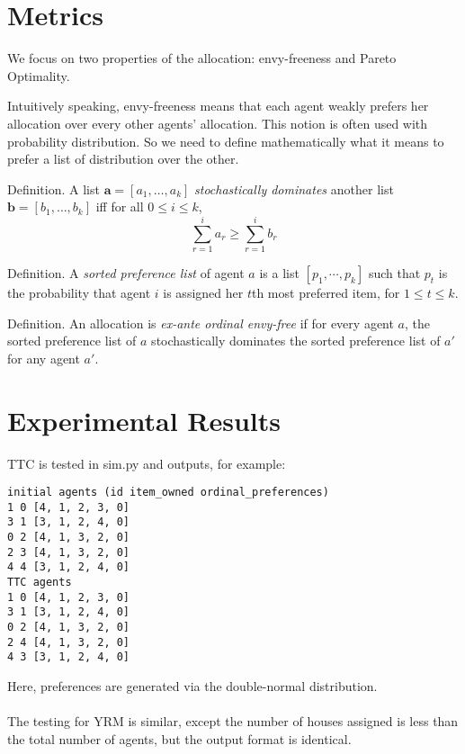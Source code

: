 \documentclass[12pt]{article}
\begin{document}
\section*{Metrics}

We focus on two properties of the allocation: envy-freeness and Pareto Optimality. 

Intuitively speaking, envy-freeness means that each agent weakly prefers her allocation over every other agents' allocation. This notion is often used with probability distribution. So we need to define mathematically what it means to prefer a list of distribution over the other.

Definition. A list $\mathbf{a} = [a_1, \dots, a_k]$ \textit{stochastically dominates} another list $\mathbf{b} = [b_1, \dots, b_k]$ iff for all $0 \leq i \leq k$, $$ \sum_{r=1}^i a_r \geq \sum_{r=1}^i b_r $$

Definition. A \textit{sorted preference list} of agent $a$ is a list $[p_1, \cdots, p_k]$ such that $p_t$ is the probability that agent $i$ is assigned her $t$th most preferred item, for $1 \leq t \leq k$.

Definition. An allocation is \textit{ex-ante ordinal envy-free} if for every agent $a$, the sorted preference list of $a$ stochastically dominates the sorted preference list of $a'$ for any agent $a'$.





\section*{Experimental Results}
TTC is tested in sim.py and outputs, for example:
\begin{verbatim}
initial agents (id item_owned ordinal_preferences)
1 0 [4, 1, 2, 3, 0]
3 1 [3, 1, 2, 4, 0]
0 2 [4, 1, 3, 2, 0]
2 3 [4, 1, 3, 2, 0]
4 4 [3, 1, 2, 4, 0]
TTC agents
1 0 [4, 1, 2, 3, 0]
3 1 [3, 1, 2, 4, 0]
0 2 [4, 1, 3, 2, 0]
2 4 [4, 1, 3, 2, 0]
4 3 [3, 1, 2, 4, 0]
\end{verbatim}
Here, preferences are generated via the double-normal distribution.\\\\The testing for YRM is similar, except the number of houses assigned is less than the total number of agents, but the output format is identical.
\end{document}
